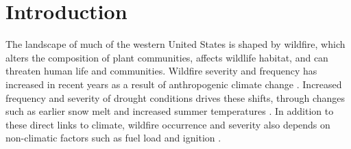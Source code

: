\documentclass[11p]{article}
\begin{document}




\section{Introduction}

The landscape of much of the western United States is shaped by wildfire, which alters the composition of plant communities, affects wildlife habitat, and can threaten human life and communities. Wildfire severity and frequency has increased in recent years as a result of anthropogenic climate change \citep{abatzoglouImpactAnthropogenicClimate2016,runningGlobalWarmingCausing2006,boerChangingWeatherExtremes2017,littellReviewRelationshipsDrought2016}. Increased frequency and severity of drought conditions drives these shifts, through changes such as earlier snow melt \citep{tercekForecasts21stCentury2016} and increased summer temperatures \citep{runningGlobalWarmingCausing2006}. In addition to these direct links to climate, wildfire occurrence and severity also depends on non-climatic factors such as fuel load and ignition \citep{mckenzieClimateChangeEcohydrology2017}.
\end{document}
